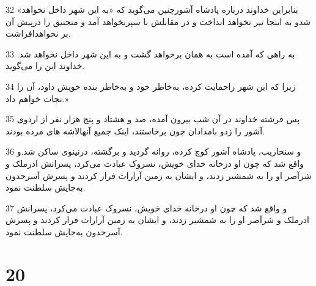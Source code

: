\par 32 «بنابراین خداوند درباره پادشاه آشورچنین می‌گوید که «به این شهر داخل نخواهد شدو به اینجا تیر نخواهد انداخت و در مقابلش با سپرنخواهد آمد و منجنیق را در‌پیش آن بر نخواهدافراشت.
\par 33 به راهی که آمده است به همان برخواهد گشت و به این شهر داخل نخواهد شد. خداوند این را می‌گوید.
\par 34 زیرا که این شهر راحمایت کرده، به‌خاطر خود و به‌خاطر بنده خویش داود، آن را نجات خواهم داد.»
\par 35 پس فرشته خداوند در آن شب بیرون آمده، صد و هشتاد و پنج هزار نفر از اردوی آشور را زدو بامدادان چون برخاستند، اینک جمیع آنهالاشه های مرده بودند.
\par 36 و سنحاریب، پادشاه آشور کوچ کرده، روانه گردید و برگشته، درنینوی ساکن شد.و واقع شد که چون او درخانه خدای خویش، نسروک عبادت می‌کرد، پسرانش ادرملک و شرآصر او را به شمشیر زدند، و ایشان به زمین آرارات فرار کردند و پسرش آسرحدون به‌جایش سلطنت نمود.
\par 37 و واقع شد که چون او درخانه خدای خویش، نسروک عبادت می‌کرد، پسرانش ادرملک و شرآصر او را به شمشیر زدند، و ایشان به زمین آرارات فرار کردند و پسرش آسرحدون به‌جایش سلطنت نمود.
 
\chapter{20}

